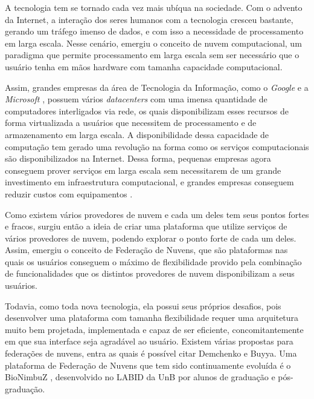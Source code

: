 A tecnologia tem se tornado cada vez mais ubíqua na sociedade. Com o advento da Internet, a interação dos seres humanos com a tecnologia cresceu bastante, gerando um tráfego imenso de dados, e com isso a necessidade de processamento em larga escala. Nesse cenário, emergiu o conceito de nuvem computacional, um paradigma que permite processamento em larga escala sem ser necessário que o usuário tenha em mãos hardware com tamanha capacidade computacional.

Assim, grandes empresas da área de Tecnologia da Informação, como o \textit{Google} \cite{Google} e a \textit{Microsoft} \cite{Microsoft}, possuem vários \textit{datacenters} com uma imensa quantidade de computadores interligados via rede, os quais disponibilizam esses recursos de forma virtualizada a usuários que necessitem de processamento e de armazenamento em larga escala. A disponibilidade dessa capacidade de computação tem gerado uma revolução na forma como os serviços computacionais são disponibilizados na Internet.
Dessa forma, pequenas empresas agora conseguem prover serviços em larga escala sem necessitarem de um grande investimento em infraestrutura computacional, e grandes empresas conseguem reduzir custos com equipamentos \cite{WhatIsCloudComputing}.

Como existem vários provedores de nuvem e cada um deles tem seus pontos fortes e fracos, surgiu então a ideia de criar uma plataforma que utilize serviços de vários provedores de nuvem, podendo explorar o ponto forte de cada um deles. Assim, emergiu o conceito de Federação de Nuvens\cite{6427607}, que são plataformas nas quais os usuários conseguem o máximo de flexibilidade provido pela combinação de funcionalidades que os distintos provedores de nuvem disponibilizam a seus usuários.

Todavia, como toda nova tecnologia, ela possui seus próprios desafios, pois desenvolver uma plataforma com tamanha flexibilidade requer uma arquitetura muito bem projetada, implementada e capaz de ser eficiente, concomitantemente em que sua interface seja agradável ao usuário. Existem várias propostas para federações de nuvens, entra as quais é possível citar Demchenko\cite{6427607} e Buyya\cite{Buyya:2010:IUF:2143583.2143586}. Uma plataforma de Federação de Nuvens que tem sido continuamente evoluída é o BioNimbuZ \cite{BioNimbuZ_Breno_Deric} \cite{BioNimbuZ_Closer} \cite{BioNimbuZ_6846526} \cite{Saldanha2012} \cite{6732620_BioNimbuZ_ACOsched} \cite{BioNimbuZ_Willian_C99} \cite{closer12_BioNimbuZ_AHP} \cite{Saldanha_BioNimbus}, desenvolvido no \acrfull{LABID} da \acrfull{UnB} por alunos de graduação e pós-graduação.


